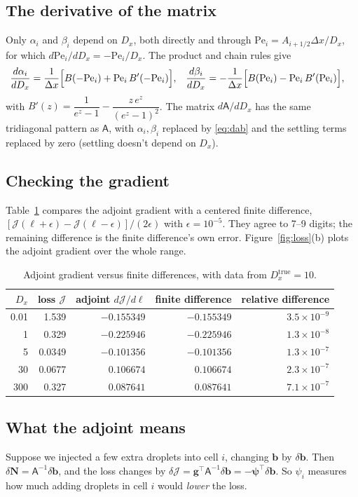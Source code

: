 \documentclass[11pt]{article}
\newcommand{\J}{\mathcal{J}}
\newcommand{\A}{\mathsf{A}}
\newcommand{\N}{\mathbf{N}}
\newcommand{\bpsi}{\bm{\psi}}
\newcommand{\Pe}{\mathrm{Pe}}
\begin{document}
\subsection{The derivative of the matrix}
Only $\alpha_i$ and $\beta_i$ depend on $D_x$, both directly and through $\Pe_i = A_{i+1/2}\Delta x/D_x$, for which $d\Pe_i/dD_x = -\Pe_i/D_x$. The product and chain rules give
\begin{align}
\frac{d\alpha_i}{dD_x} &= \frac{1}{\Delta x}\Bigl[B(-\Pe_i) + \Pe_i\,B'(-\Pe_i)\Bigr], &
\frac{d\beta_i}{dD_x} &= -\frac{1}{\Delta x}\Bigl[B(\Pe_i) - \Pe_i\,B'(\Pe_i)\Bigr],\label{eq:dab}
\end{align}
with $B'(z) = \dfrac{1}{e^z-1} - \dfrac{z\,e^z}{(e^z-1)^2}$. The matrix $d\A/dD_x$ has the same tridiagonal pattern as $\A$, with $\alpha_i,\beta_i$ replaced by \eqref{eq:dab} and the settling terms replaced by zero (settling doesn't depend on $D_x$).

\subsection{Checking the gradient}
Table~\ref{tab:check} compares the adjoint gradient with a centered finite difference, $[\J(\ell+\epsilon) - \J(\ell-\epsilon)]/(2\epsilon)$ with $\epsilon = 10^{-5}$. They agree to 7--9 digits; the remaining difference is the finite difference's own error. Figure~\ref{fig:loss}(b) plots the adjoint gradient over the whole range.

\begin{table}[h]
\centering\small
\begin{tabular}{@{}rrrrr@{}}
\toprule
$D_x$ & loss $\J$ & adjoint $d\J/d\ell$ & finite difference & relative difference\\\midrule
0.01 & 1.539 & $-0.155349$ & $-0.155349$ & $3.5\times10^{-9}$\\
1 & 0.329 & $-0.225946$ & $-0.225946$ & $1.3\times10^{-8}$\\
5 & 0.0349 & $-0.101356$ & $-0.101356$ & $1.3\times10^{-7}$\\
30 & 0.0677 & $0.106674$ & $0.106674$ & $2.3\times10^{-7}$\\
300 & 0.327 & $0.087641$ & $0.087641$ & $7.1\times10^{-7}$\\\bottomrule
\end{tabular}
\caption{Adjoint gradient versus finite differences, with data from $D_x^{\mathrm{true}} = 10$.}\label{tab:check}
\end{table}

\subsection{What the adjoint means}
Suppose we injected a few extra droplets into cell $i$, changing $\mathbf{b}$ by $\delta\mathbf{b}$. Then $\delta\N = \A^{-1}\delta\mathbf{b}$, and the loss changes by $\delta\J = \mathbf{g}^\top\A^{-1}\delta\mathbf{b} = -\bpsi^\top\delta\mathbf{b}$. So $\psi_i$ measures how much adding droplets in cell $i$ would \emph{lower} the loss.
\end{document}

